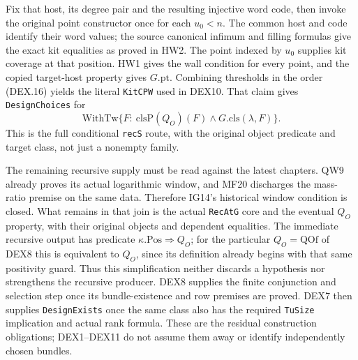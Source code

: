 Fix that host, its degree pair and the resulting injective word code, then
invoke the original point constructor once for each $u_0<n$.
The common host and code identify their word values; the source
canonical infimum and filling formulas give the exact kit equalities
as proved in HW2. The point indexed by $u_0$ supplies kit coverage
at that position. HW1 gives the wall condition for every point,
and the copied target-host property gives $G.\mathrm{pt}$.
Combining thresholds in the order (DEX.16) yields the literal
\texttt{KitCPW} used in DEX10. That claim gives
\texttt{DesignChoices} for
\[
 \mathrm{WithTw}\{F:\ \mathrm{clsP}(Q_O)(F)
                                  \wedge G.\mathrm{cls}(\lambda,F)\}.
                                                               \tag{DEX.20}
\]
This is the full conditional \texttt{recS} route, with the original
object predicate and target class, not just a nonempty family.

The remaining recursive supply must be read against the latest
chapters. QW9 already proves its actual logarithmic window, and
MF20 discharges the mass-ratio premise on the same data. Therefore
IG14's historical window condition is closed. What remains in
that join is the actual \texttt{RecAtG} core and the eventual
$Q_O$ property, with their original objects and dependent equalities.
The immediate recursive output has predicate
$\kappa.\mathrm{Pos}\Rightarrow Q_O$; for the particular
$Q_O=\mathrm{QOf}$ of DEX8 this is equivalent to $Q_O$, since
its definition already begins with that same positivity guard.
Thus this simplification neither discards a hypothesis nor strengthens
the recursive producer.
DEX8 supplies the finite conjunction and selection step once its
bundle-existence and row premises are proved. DEX7 then supplies
\texttt{DesignExists} once the same class also has the required
\texttt{TuSize} implication and actual rank formula. These are
the residual construction obligations; DEX1--DEX11 do not assume
them away or identify independently chosen bundles.
